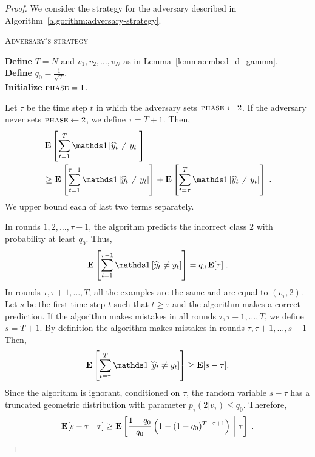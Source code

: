 \begin{proof}
We consider the strategy for the adversary described in
Algorithm~\ref{algorithm:adversary-strategy}.

\begin{algorithm}
\caption{\textsc{Adversary's strategy}}
\label{algorithm:adversary-strategy}
\textbf{Define} $T=N$ and $v_1, v_2, \dots, v_N$ as in Lemma~\ref{lemma:embed_d_gamma}.\\
\textbf{Define} $q_0=\frac{1}{\sqrt{T}}$. \\
\textbf{Initialize} $\textsc{phase}= 1$. \\
\end{algorithm}

Let $\tau$ be the time step $t$ in which the adversary sets $\textsc{phase}\leftarrow 2$.
If the adversary never sets $\textsc{phase}\leftarrow 2$, we define $\tau = T + 1$.
Then,
\begin{align}
& \Exp \left[\sum_{t=1}^T \indicator{\widehat y_t\neq y_t}\right] \nonumber \\
& \ge \Exp\left[\sum_{t=1}^{\tau - 1} \indicator{\widehat y_t\neq y_t}\right]
+ \Exp\left[\sum_{t=\tau}^T \indicator{\widehat y_t\neq y_t}\right] \; .
\end{align}
We upper bound each of last two terms separately.

In rounds $1,2,\dots,\tau-1$, the algorithm predicts the incorrect class $2$
with probability at least $q_0$. Thus,
$$
\Exp\left[\sum_{t=1}^{\tau - 1} \indicator{\widehat y_t\neq y_t}\right] = q_0 \Exp[\tau] \; .
$$
In rounds $\tau, \tau+1, \dots, T$, all the examples are the same and are equal
to $(v_\tau, 2)$. Let $s$ be the first time step $t$ such that $t \ge \tau$
and the algorithm makes a correct prediction. If the algorithm makes mistakes
in all rounds $\tau, \tau+1, \dots, T$, we define $s = T+1$.
By definition the algorithm makes mistakes in rounds $\tau, \tau+1, \dots, s-1$
Then,
$$
\Exp\left[\sum_{t=\tau}^T \indicator{\widehat y_t\neq y_t}\right] \ge \Exp[s-\tau].
$$
Since the algorithm is ignorant, conditioned on $\tau$, the random variable $s-\tau$
has a truncated geometric distribution with parameter $p_\tau(2|v_\tau) \le q_0$.
Therefore,
$$
\operatorname*{\mathbf{E}}[s-\tau ~|~ \tau]
\ge
\operatorname*{\mathbf{E}} \left[\frac{1-q_0}{q_0}\left(1-(1-q_0)^{T-\tau+1}\right) ~\middle|~ \tau \right] \; .
$$


\end{proof}
